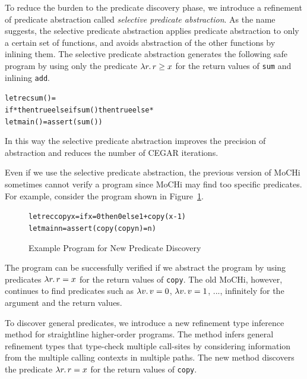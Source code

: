 \begin{enumerate}
      To reduce the burden to the predicate discovery phase, we introduce
      a refinement of predicate abstraction called \emph{selective
      predicate abstraction}.  As the name suggests, the selective
      predicate abstraction applies predicate abstraction to only a
      certain set of functions, and avoids abstraction of the other
      functions by inlining them.  The selective predicate abstraction
      generates the following safe program by using only the
      predicate $\lambda{r}.\,{r \geq x}$ for the return values of \texttt{sum}
      and inlining \texttt{add}.
\begin{alltt}
let rec sum () =
  if * then true else if sum () then true else *
let main () = assert (sum ())
\end{alltt}
      In this way the selective predicate abstraction improves the
      precision of abstraction and reduces the number of CEGAR iterations.

      Even if we use the selective predicate abstraction, the previous
      version of MoCHi sometimes cannot verify a program since MoCHi may
      find too specific predicates.  For example, consider the program
      shown in Figure~\ref{fig:copy}.
\begin{figure}[t]
\begin{alltt}
let rec copy x = if x=0 then 0 else 1 + copy (x-1)
let main n = assert (copy (copy n) = n)
\end{alltt}
\caption{Example Program for New Predicate Discovery}
\label{fig:copy}
\end{figure}
      The program can be successfully verified if we abstract the
      program by using predicates $\lambda{r}.\,{r = x}$ for the return values
      of \texttt{copy}.  The old MoCHi, however, continues to find
      predicates such as $\lambda{v}.\,{v = 0}$, $\lambda{v}.\,{v = 1}$, ...,
      infinitely for the argument and the return values.

      To discover general predicates, we introduce a new refinement type
      inference method for straightline higher-order programs.
      The method infers general refinement types that type-check
      multiple call-sites by considering information from the multiple
      calling contexts in multiple paths.  The new method discovers the
      predicate $\lambda{r}.\,{r = x}$ for the return values of \texttt{copy}.


\end{enumerate}
